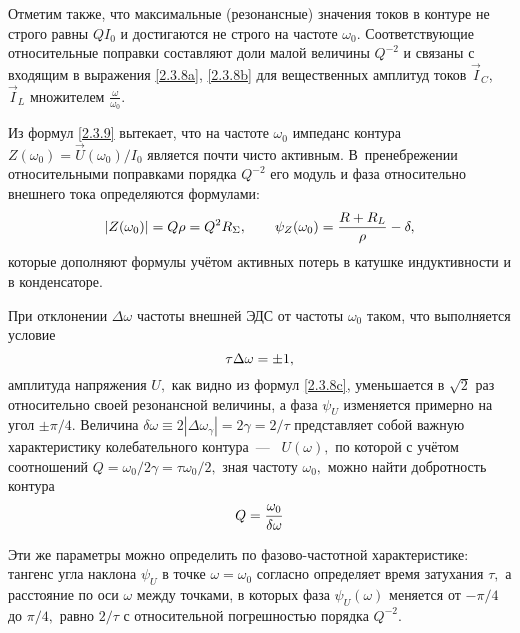 Отметим также, что максимальные (резонансные) значения токов в контуре 
не строго равны $QI_0$ и достигаются не строго на частоте $\omega_0$.
Соответствующие относительные поправки составляют доли малой 
величины $Q^{-2}$ и связаны с входящим в выражения 
\eqref{2.3.8a}, \eqref{2.3.8b} для вещественных амплитуд 
токов $\vec{I}_{\! C}$, $\vec{I}_{\! L}$ множителем $\frac{\omega}{\omega_0}$.

Из формул \eqref{2.3.9} вытекает, что на частоте $\omega_0$ импеданс контура
$Z(\omega_0)=\vec U(\omega_0)/I_0$ является почти чисто активным. В~пренебрежении 
относительными поправками порядка $Q^{-2}$ его модуль и фаза относительно внешнего 
тока определяются формулами:
\begin{equation}\eqmark{2.3.10}
|Z(\omega_0)|=Q\rho=Q^2R_{\Sigma}, \qquad
\psi_Z(\omega_0)=\dfrac{R+R_L}{\rho}-\delta,
\end{equation}
которые дополняют формулы  учётом активных потерь в катушке
индуктивности и в конденсаторе.

При отклонении $\Delta\omega$ частоты внешней ЭДС от частоты $\omega_0$ таком,
что выполняется условие
\begin{equation}\eqmark{2.3.11}
\tau\Delta\omega=\pm1,
\end{equation}
амплитуда напряжения $U,$ как видно из формул \eqref{2.3.8c}, уменьшается в
$\sqrt{2}$ раз относительно своей резонансной величины, а фаза $\psi_U$
изменяется примерно на угол $\pm\pi/4.$
Величина $\delta\omega\equiv2|\Delta\omega_{\gamma}|=2\gamma=2/\tau$
представляет собой важную характеристику колебательного
контура~---~ $U(\omega),$ по которой с
учётом соотношений $Q=\omega_0/2\gamma=\tau\omega_0/2,$ зная частоту $\omega_0,$
можно найти добротность контура
\begin{equation}\eqmark{2.3.12}
Q=\dfrac{\omega_0}{\delta\omega}
\end{equation}

Эти же параметры можно определить по фазово-частотной характеристике: тангенс
угла наклона $\psi_U$ в точке $\omega=\omega_0$ согласно 
определяет время затухания $\tau,$ а расстояние по оси $\omega$ между точками, в
которых фаза $\psi_U(\omega)$ меняется от $-\pi/4$ до $\pi/4,$ равно $2/\tau$ с
относительной погрешностью порядка $Q^{-2}.$

